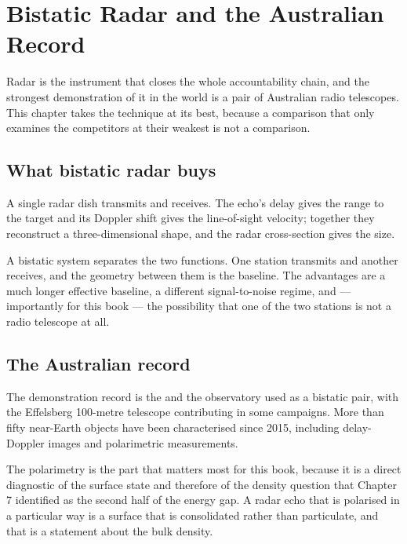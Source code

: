 
\chapter{Bistatic Radar and the Australian Record}
\label{ch:bistatic-radar}

Radar is the instrument that closes the whole accountability chain, and the
strongest demonstration of it in the world is a pair of Australian radio
telescopes. This chapter takes the technique at its best, because a
comparison that only examines the competitors at their weakest is not a
comparison.

\section{What bistatic radar buys}

A single radar dish transmits and receives. The echo's delay gives the
range to the target and its Doppler shift gives the line-of-sight velocity;
together they reconstruct a three-dimensional shape, and the radar
cross-section gives the size.

A bistatic system separates the two functions. One station transmits and
another receives, and the geometry between them is the baseline. The
advantages are a much longer effective baseline, a different signal-to-noise
regime, and --- importantly for this book --- the possibility that one of the
two stations is not a radio telescope at all.

\section{The Australian record}

The demonstration record is the  and the 
observatory used as a bistatic pair, with the Effelsberg 100-metre telescope
contributing in some campaigns. More than fifty near-Earth objects have been
characterised since 2015, including delay-Doppler images and polarimetric
measurements.

The polarimetry is the part that matters most for this book, because it is a
direct diagnostic of the surface state and therefore of the density question
that Chapter 7 identified as the second half of the energy gap. A radar
echo that is polarised in a particular way is a surface that is consolidated
rather than particulate, and that is a statement about the bulk density.

